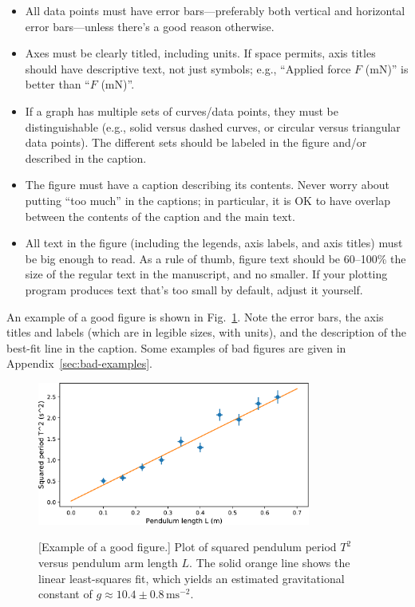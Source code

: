 \documentclass[11pt,a4paper]{article}
\begin{document}
\begin{itemize}
\item All data points must have error bars---preferably both vertical
  and horizontal error bars---unless there's a good reason otherwise.

\item Axes must be clearly titled, including units.  If space permits,
  axis titles should have descriptive text, not just symbols; e.g.,
  ``Applied force $F$ (mN)'' is better than ``$F$ (mN)''.

\item If a graph has multiple sets of curves/data points, they must be
  distinguishable (e.g., solid versus dashed curves, or circular
  versus triangular data points).  The different sets should be
  labeled in the figure and/or described in the caption.

\item The figure must have a caption describing its contents.  Never
  worry about putting ``too much'' in the captions; in particular, it
  is OK to have overlap between the contents of the caption and the
  main text.

\item
  All text in the figure (including the legends, axis labels, and axis
  titles) must be big enough to read.  As a rule of thumb, figure text
  should be 60--100\% the size of the regular text in the manuscript,
  and no smaller.  If your plotting program produces text that's too
  small by default, adjust it yourself.
\end{itemize}
\noindent
An example of a good figure is shown in Fig.~\ref{pendulum-figure-1}.
Note the error bars, the axis titles and labels (which are in legible
sizes, with units), and the description of the best-fit line in the
caption.  Some examples of bad figures are given in
Appendix~\ref{sec:bad-examples}.

\begin{figure}[h]
  \centering
  \includegraphics[width=0.8\textwidth]{pendulum-figure-1.pdf} \\
  \caption{\small [Example of a good figure.]  Plot of squared
    pendulum period $T^2$ versus pendulum arm length $L$.  The solid
    orange line shows the linear least-squares fit, which yields an
    estimated gravitational constant of $g \approx 10.4 \pm
    0.8\,\textrm{ms}^{-2}$.}
  \label{pendulum-figure-1}
\end{figure}
\end{document}
